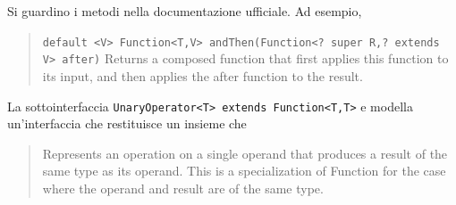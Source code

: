 \documentclass[\fontsizeclass,twocolumn]{\classname}
\theoremstyle{definition}
\theoremstyle{definition}
\begin{document}
Si guardino i metodi nella documentazione ufficiale. Ad esempio,
\begin{quote}
    \footnotesize{\texttt{default <V> Function<T,V>	andThen(Function<? super R,? extends V> after)}
Returns a composed function that first applies this function to its input, and then applies the after function to the result.}
\end{quote}


La sottointerfaccia \texttt{UnaryOperator<T> extends Function<T,T>} e modella
un'interfaccia che restituisce un insieme che 
\begin{quote}
    \footnotesize{Represents an operation on a single operand that produces a
    result of the same type as its operand. This is a specialization of
Function for the case where the operand and result are of the same type.}
\end{quote}
\end{document}
